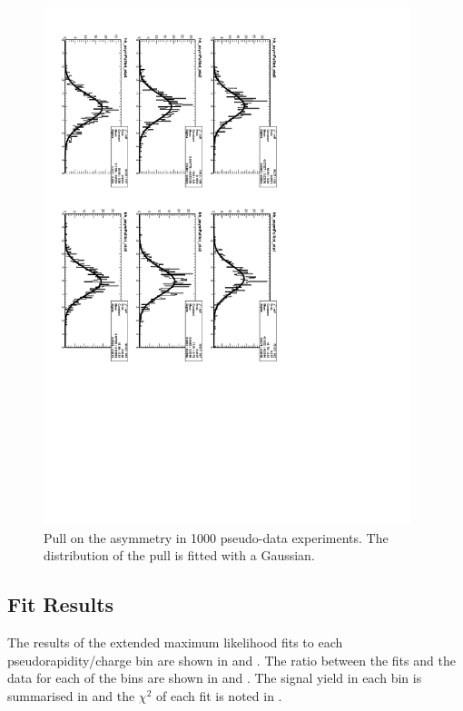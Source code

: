 \begin{figure}[htbp]
  \begin{center}
\includegraphics*[angle=90,width=0.95\textwidth]{pullasyTot.pdf}
    \caption{\label{fig:toyasym_pull}Pull on the asymmetry in 1000 pseudo-data experiments. The distribution of the pull is fitted with a Gaussian.}
  \end{center}
\end{figure}

\subsection{Fit Results}

The results of the extended maximum likelihood fits to each pseudorapidity/charge
bin are shown in  and .
The ratio between the fits and the data for each of the 
bins are shown in  and .
The signal yield in each bin is summarised in  and the
$\chi^2$ of each fit is noted in .

